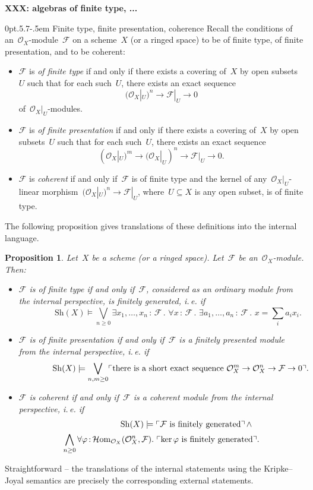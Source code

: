 \documentclass[10pt,reqno,a4paper]{amsbook}
\makeatletter
\theoremstyle{definition}
\theoremstyle{plain}
\newtheorem{prop}[defn]{Proposition}
\theoremstyle{remark}
\newcommand{\F}{\mathcal{F}}
\renewcommand{\O}{\mathcal{O}}
\newcommand{\HOM}{\mathcal{H}\mathrm{om}}
\newcommand{\Sh}{\mathrm{Sh}}
\DeclareMathOperator{\Kernel}{ker}
\newcommand{\?}{\,{:}\,}
\renewcommand{\_}{\mathpunct{.}\,}
\newcommand{\speak}[1]{\ulcorner\text{\textnormal{#1}}\urcorner}
\newcommand{\ie}{i.\,e.\@\xspace}
\newcommand{\XXX}[1]{\textbf{XXX: #1}}
\renewenvironment{proof}[1][\proofname]{\par
  \pushQED{\qed}%
  \normalfont \topsep6\p@\@plus6\p@\relax
  \trivlist
  \item[\hskip\labelsep
        \itshape
    #1\@addpunct{.}]\ignorespaces
}{%
  \popQED\endtrivlist\@endpefalse
}
\def\subsection{\@startsection{subsection}{2}%
  {0pt}{.5\linespacing\@plus.7\linespacing}{-.5em}%
  {\normalfont\bfseries}}
\makeatother
\begin{document}
\XXX{algebras of finite type, ...}

\subsection{Finite type, finite presentation, coherence}
Recall the conditions of an~$\O_X$-module~$\F$ on a scheme~$X$ (or a ringed
space) to be of finite type, of finite presentation, and to be coherent:
\begin{itemize}
\item $\F$ is \emph{of finite type} if and only if there exists a covering of~$X$ by
open subsets~$U$ such that for each such~$U$, there exists an exact sequence
\[ (\O_X|_U)^n \longrightarrow \F|_U \longrightarrow 0 \]
of~$\O_X|_U$-modules.
\item $\F$ is \emph{of finite presentation} if and only if there exists a covering of~$X$ by
open subsets~$U$ such that for each such~$U$, there exists an exact sequence
\[ (\O_X|_U)^m \longrightarrow (\O_X|_U)^n \longrightarrow \F|_U \longrightarrow 0. \]
\item $\F$ is \emph{coherent} if and only if~$\F$ is of finite type and the
kernel of any~$\O_X|_U$-linear morphism~$(\O_X|_U)^n \to \F|_U$, where~$U \subseteq
X$ is any open subset, is of finite type.
\end{itemize}

The following proposition gives translations of these definitions into the
internal language.
\begin{prop}\label{prop:finite-type-and-co}
Let~$X$ be a scheme (or a ringed space). Let~$\F$ be
an~$\O_X$-module. Then:
\begin{itemize}
\item $\F$ is of finite type if and only if~$\F$, considered as an ordinary
module from the internal perspective, is finitely generated, \ie if
\[ {\qquad\qquad} \Sh(X) \models
  \bigvee_{n \geq 0}
  \exists x_1,\ldots,x_n\?\F\_
  \forall x\?\F\_
  \exists a_1,\ldots,a_n\?\F\_
  x = \textstyle\sum\limits_i a_i x_i. \]
\item $\F$ is of finite presentation if and only if~$\F$ is a finitely
presented module from the internal perspective, \ie if
\[ {\qquad\qquad} \Sh(X) \models \bigvee_{n,m \geq 0}
  \speak{there is a short exact sequence $\O_X^m \to \O_X^n \to \F \to 0$}.
  \]
\item $\F$ is coherent if and only if~$\F$ is a coherent module from the
internal perspective, \ie if
\begin{multline*}
{\qquad\qquad\qquad}
  \Sh(X) \models \speak{$\F$ is finitely generated} \mathop{\wedge} \\
  \bigwedge_{n \geq 0} \forall \varphi \? \HOM_{\O_X}(\O_X^n,\F)\_
  \speak{$\Kernel \varphi$ is finitely generated}.
\end{multline*}
\end{itemize}
\end{prop}
\begin{proof}Straightforward -- the translations of the internal statements using
the Kripke--Joyal semantics are precisely the corresponding external
statements.
\end{proof}
\end{document}
